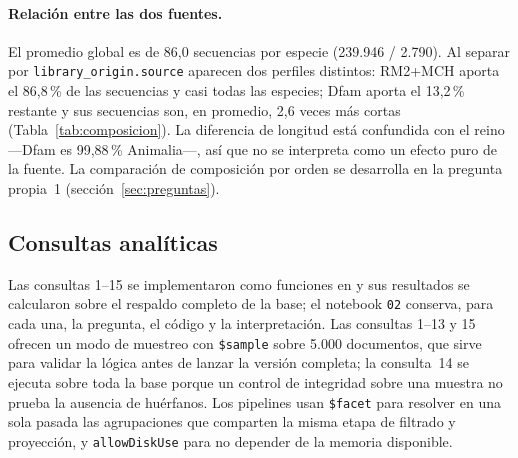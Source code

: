 \documentclass[journal]{IEEEtran}
\begin{document}
\paragraph*{Relación entre las dos fuentes.}
El promedio global es de 86,0 secuencias por especie (239.946 / 2.790). Al separar por
\texttt{library\_origin.source} aparecen dos perfiles distintos: RM2+MCH aporta el 86,8\,\% de
las secuencias y casi todas las especies; Dfam aporta el 13,2\,\% restante y sus secuencias
son, en promedio, 2,6 veces más cortas (Tabla~\ref{tab:composicion}). La diferencia de
longitud está confundida con el reino ---Dfam es 99,88\,\% Animalia---, así que no se
interpreta como un efecto puro de la fuente. La comparación de composición por orden se
desarrolla en la pregunta propia~1 (sección~\ref{sec:preguntas}).

\subsection{Consultas analíticas}
\label{sec:consultas}
Las consultas 1--15 se implementaron como funciones en
 y sus resultados se calcularon sobre el
respaldo completo de la base; el notebook \texttt{02} conserva, para cada una, la pregunta,
el código y la interpretación. Las consultas 1--13 y 15 ofrecen un modo de muestreo con
\texttt{\$sample} sobre 5.000 documentos, que sirve para validar la lógica antes de lanzar
la versión completa; la consulta~14 se ejecuta sobre toda la base porque un control de
integridad sobre una muestra no prueba la ausencia de huérfanos. Los pipelines usan
\texttt{\$facet} para resolver en una sola pasada las agrupaciones que comparten la misma
etapa de filtrado y proyección, y \texttt{allowDiskUse} para no depender de la memoria
disponible.
\end{document}
